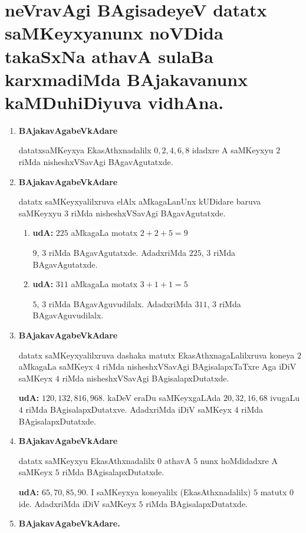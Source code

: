 \chapter{neVravAgi BAgisadeyeV datatx saMKeyxyanunx noVDida takaSxNa athavA sulaBa karxmadiMda BAjakavanunx kaMDuhiDiyuva vidhAna.}
\begin{enumerate}[{\rm 1)}]
\item {} \textbf{BAjakavAgabeVkAdare}

datatxsaMKeyxya EkasAthxnadalilx $0,2,4,6,8$ idadxre A saMKeyxyu $2$ riMda \-nisheshxVSavAgi BAgavAgutatxde.

\item {} \textbf{BAjakavAgabeVkAdare}

datatx saMKeyxyalilxruva elAlx aMkagaLanUnx kUDidare baruva saMKeyxyu $3$ riMda nisheshxVSavAgi BAgavAgutatxde.
\begin{enumerate}[{\rm 1)}]
\item \textbf{udA:} \quad $225$ aMkagaLa motatx $2+2+5 =9$

$9$, $3$ riMda BAgavAgutatxde. AdadxriMda $225$, $3$ riMda BAgavAgutatxde.

\item \textbf{udA:} \quad $311$ aMkagaLa motatx $3+1+1 =5$

 $5$, $3$ riMda BAgavAguvudilalx. AdadxriMda $311$, $3$ riMda BAgavAguvudilalx.
\end{enumerate}

\vfill\eject
\item {} \textbf{BAjakavAgabeVkAdare}

datatx saMKeyxyalilxruva dashaka matutx EkasAthxnagaLalilxruva koneya $2$ aMkagaLa saMKeyx $4$ riMda nisheshxVSavAgi BAgisalapxTaTxre Aga iDiV saMKeyx $4$ riMda nisheshxVSavAgi BAgi\-salapxDutatxde.

\textbf{udA:} $120,132,816,968$. kaDeV eraDu saMKeyxgaLAda $20,32,16,68$ ivugaLu $4$ riMda BAgisalapxDutatxve. AdadxriMda iDiV saMKeyx $4$ riMda BAgi\-salapxDutatxde.

\item  {} \textbf{BAjakavAgabeVkAdare}

datatx saMKeyxyu EkasAthxnadalilx $0$ athavA $5$ nunx hoMdidadxre A saMKeyx $5$ riMda BAgi\-salapxDutatxde.

\textbf{udA:} $65,70,85,90.$  I saMKeyxya koneyalilx (EkasAthxnadalilx) $5$ matutx $0$ ide. AdadxriMda iDiV saMKeyx $5$ riMda BAgisalapxDutatxde.
\item {} \textbf{BAjakavAgabeVkAdare.}


\end{enumerate}
